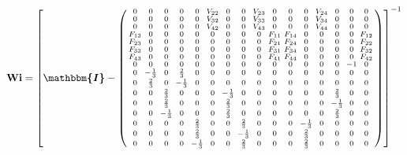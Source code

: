 \[ \mathbf{Wi} =  \left[ \boldsymbol{\mathbbm{I}}  -
\left(\begin{smallmatrix} 0 & 0 & 0 & 0 & 0 & V_{22} & 0 & 0 & V_{23}
& 0 & 0 & 0 & V_{24} & 0 & 0 & 0 \\ 0 & 0 & 0 & 0 & 0 & V_{32} & 0 & 0
& V_{33} & 0 & 0 & 0 & V_{34} & 0 & 0 & 0 \\ 0 & 0 & 0 & 0 & 0 &
V_{42} & 0 & 0 & V_{43} & 0 & 0 & 0 & V_{44} & 0 & 0 & 0 \\ F_{13} & 0
& 0 & 0 & 0 & 0 & 0 & 0 & 0 & F_{11} & F_{14} & 0 & 0 & 0 & 0 & F_{12}
\\ F_{23} & 0 & 0 & 0 & 0 & 0 & 0 & 0 & 0 & F_{21} & F_{24} & 0 & 0 &
0 & 0 & F_{22} \\ F_{33} & 0 & 0 & 0 & 0 & 0 & 0 & 0 & 0 & F_{31} &
F_{34} & 0 & 0 & 0 & 0 & F_{32} \\ F_{43} & 0 & 0 & 0 & 0 & 0 & 0 & 0
& 0 & F_{41} & F_{44} & 0 & 0 & 0 & 0 & F_{42} \\ 0 & 0 & 0 & 0 & 0 &
0 & 0 & 0 & 0 & 0 & 0 & 0 & 0 & 0 & -1 & 0 \\ 0 & -\frac{1}{3} & 0 &
\frac{2}{3} & 0 & 0 & 0 & 0 & 0 & 0 & 0 & 0 & 0 & 0 & 0 & 0 \\ 0 &
\frac{2}{3} & 0 & -\frac{1}{3} & 0 & 0 & 0 & 0 & 0 & 0 & 0 & 0 & 0 & 0
& 0 & 0 \\ 0 & 0 & \frac{2}{3} & 0 & 0 & 0 & -\frac{1}{3} & 0 & 0 & 0
& 0 & 0 & 0 & \frac{2}{3} & 0 & 0 \\ 0 & 0 & \frac{2}{3} & 0 & 0 & 0 &
\frac{2}{3} & 0 & 0 & 0 & 0 & 0 & 0 & -\frac{1}{3} & 0 & 0 \\ 0 & 0 &
-\frac{1}{3} & 0 & 0 & 0 & \frac{2}{3} & 0 & 0 & 0 & 0 & 0 & 0 &
\frac{2}{3} & 0 & 0 \\ 0 & 0 & 0 & 0 & \frac{2}{3} & 0 & 0 &
\frac{2}{3} & 0 & 0 & 0 & -\frac{1}{3} & 0 & 0 & 0 & 0 \\ 0 & 0 & 0 &
0 & \frac{2}{3} & 0 & 0 & -\frac{1}{3} & 0 & 0 & 0 & \frac{2}{3} & 0 &
0 & 0 & 0 \\ 0 & 0 & 0 & 0 & -\frac{1}{3} & 0 & 0 & \frac{2}{3} & 0 &
0 & 0 & \frac{2}{3} & 0 & 0 & 0 & 0 \end{smallmatrix}\right)
\right]^{-1}  \]

